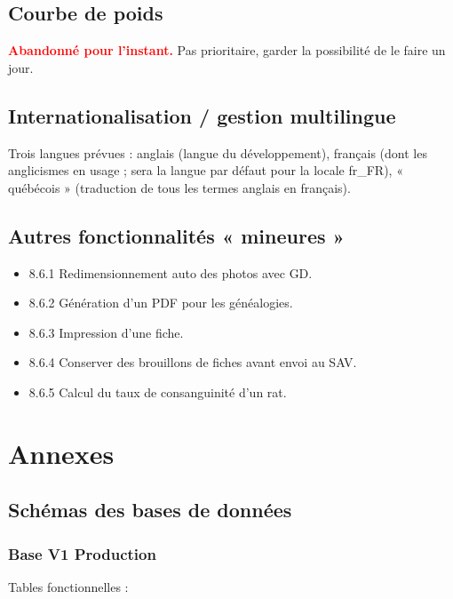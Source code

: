 \documentclass[a4paper,10pt]{article}
\newcommand\desire[1]{\noindent\textbf{\textcolor{red}{#1}}}
\begin{document}
\subsection{Courbe de poids}
\desire{Abandonné pour l'instant.} Pas prioritaire, garder la possibilité de le faire un jour.

\subsection{Internationalisation / gestion multilingue}
Trois langues prévues : anglais (langue du développement), français (dont les anglicismes en usage ; sera la langue par défaut pour la locale fr\_FR), « québécois » (traduction de tous les termes anglais en français).  

\subsection{Autres fonctionnalités « mineures »}
\begin{itemize}
\item 8.6.1 Redimensionnement auto des photos avec GD.
\item 8.6.2 Génération d'un PDF pour les généalogies.
\item 8.6.3 Impression d'une fiche.
\item 8.6.4 Conserver des brouillons de fiches avant envoi au SAV.
\item 8.6.5 Calcul du taux de consanguinité d'un rat.
\end{itemize}

\newpage
\appendix
\setlength{\parskip}{0pt}
\section{Annexes}

\subsection{Schémas des bases de données}

\subsubsection{Base V1 Production}
\label{app:dbv1}
Tables fonctionnelles :
\end{document}
